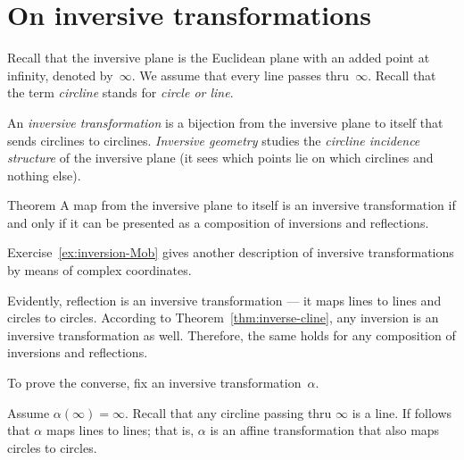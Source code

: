 


\section*{On inversive transformations}


Recall that the inversive plane is the Euclidean plane with an added point at infinity, denoted by~$\infty$.
We assume that every line passes thru~$\infty$.
Recall that the term {}\emph{circline} stands for {}\emph{circle or line}.

An \emph{inversive transformation} is a bijection from the inversive plane to itself that sends circlines to circlines.
\emph{Inversive geometry} studies the {}\emph{circline incidence structure} of the inversive plane
(it sees which points lie on which circlines and nothing else).

\begin{thm}{Theorem}\label{thm:inversions-inversive}
A map from the inversive plane to itself is an inversive transformation
if and only if it can be presented as a composition of inversions and reflections.  
\end{thm}

Exercise~\ref{ex:inversion-Mob} gives another description of inversive transformations by means of complex coordinates.

Evidently, reflection is an inversive transformation --- it maps lines to lines and circles to circles.
According to Theorem~\ref{thm:inverse-cline}, any inversion is an inversive transformation as well.
Therefore, the same holds for any composition of inversions and reflections.

To prove the converse, 
fix an inversive transformation~$\alpha$.

Assume $\alpha(\infty)=\infty$.
Recall that any circline passing thru $\infty$ is a line.
If follows that $\alpha$ maps lines to lines;
that is,
$\alpha$ is an affine transformation that also maps circles to circles.

